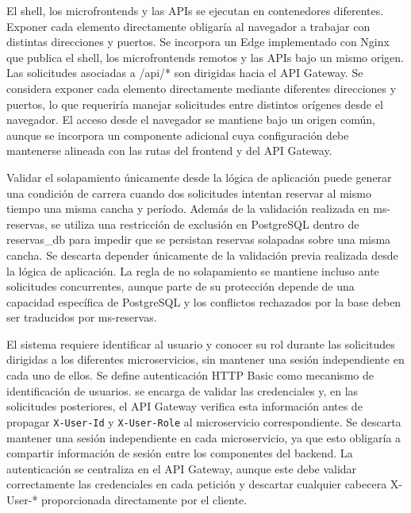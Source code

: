   {El shell, los microfrontends y las APIs se ejecutan en contenedores diferentes.
  Exponer cada elemento directamente obligaría al navegador a trabajar con
  distintas direcciones y puertos.}
  {Se incorpora un Edge implementado con Nginx que publica el shell, los
  microfrontends remotos y las APIs bajo un mismo origen. Las solicitudes
  asociadas a /api/* son dirigidas hacia el API Gateway.}
  {Se considera exponer cada elemento directamente mediante diferentes
  direcciones y puertos, lo que requeriría manejar solicitudes entre distintos
  orígenes desde el navegador.}
  {El acceso desde el navegador se mantiene bajo un origen común, aunque se
  incorpora un componente adicional cuya configuración debe mantenerse alineada
  con las rutas del frontend y del API Gateway.}

  {Validar el solapamiento únicamente desde la lógica de aplicación puede generar
  una condición de carrera cuando dos solicitudes intentan reservar al mismo
  tiempo una misma cancha y período.}
  {Además de la validación realizada en ms-reservas, se utiliza una restricción
  de exclusión en PostgreSQL dentro de reservas\_db para impedir que se persistan
  reservas solapadas sobre una misma cancha.}
  {Se descarta depender únicamente de la validación previa realizada desde la
  lógica de aplicación.}
  {La regla de no solapamiento se mantiene incluso ante solicitudes concurrentes,
  aunque parte de su protección depende de una capacidad específica de PostgreSQL
  y los conflictos rechazados por la base deben ser traducidos por ms-reservas.}

  {El sistema requiere identificar al usuario y conocer su rol durante las
  solicitudes dirigidas a los diferentes microservicios, sin mantener una sesión
  independiente en cada uno de ellos.}
  {Se define autenticación HTTP Basic como mecanismo de identificación de usuarios.
   se encarga de validar las credenciales y, en las solicitudes
  posteriores, el API Gateway verifica esta información antes de propagar
  \texttt{X-User-Id} y \texttt{X-User-Role} al microservicio correspondiente.}
  {Se descarta mantener una sesión independiente en cada microservicio, ya que
  esto obligaría a compartir información de sesión entre los componentes del
  backend.}
  {La autenticación se centraliza en el API Gateway, aunque este debe validar
  correctamente las credenciales en cada petición y descartar cualquier cabecera
  X-User-* proporcionada directamente por el cliente.}

